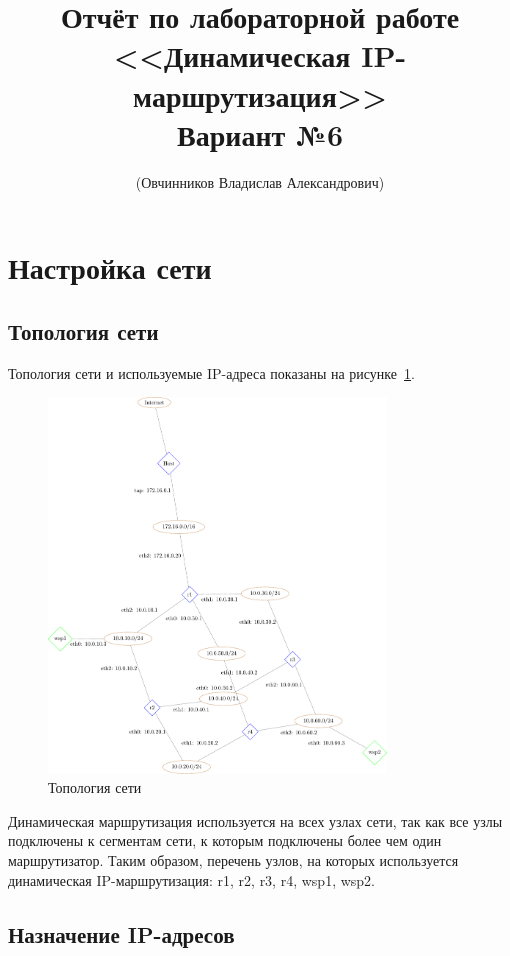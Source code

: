 \documentclass[a4paper,12pt]{article}
\title{Отчёт по лабораторной работе \\ <<Динамическая IP-маршрутизация>> \\ Вариант №6}
\author{(Овчинников Владислав Александрович)}
\begin{document}
\maketitle

\tableofcontents

\section{Настройка сети}

\subsection{Топология сети}

Топология сети и используемые IP-адреса показаны на рисунке~\ref{fig:network}.

\begin{figure}
\centering
\includegraphics[width=0.8\textwidth]{includes/network_gv.pdf}
\caption{Топология сети}
\label{fig:network}
\end{figure}

Динамическая маршрутизация используется на всех узлах сети, так как все узлы подключены к сегментам сети, к которым подключены более чем один маршрутизатор. Таким образом, перечень узлов, на которых используется динамическая IP-маршрутизация: r1, r2, r3, r4, wsp1, wsp2.

\newpage

\subsection{Назначение IP-адресов}
\end{document}
